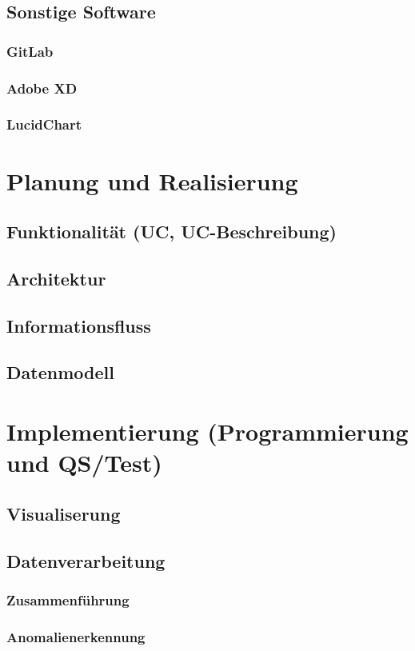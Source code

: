 \documentclass[pdftex,11pt,a4paper]{book}
\begin{document}
\section{Sonstige Software}
\subsection{GitLab}
\subsection{Adobe XD}
\subsection{LucidChart}

\chapter{Planung und Realisierung}
\section{Funktionalität (UC, UC-Beschreibung)}
\section{Architektur}
\section{Informationsfluss}
\section{Datenmodell}

\chapter{Implementierung (Programmierung und QS/Test)}
\section{Visualiserung}
\section{Datenverarbeitung}
\subsection{Zusammenführung}
\subsection{Anomalienerkennung}
\end{document}
